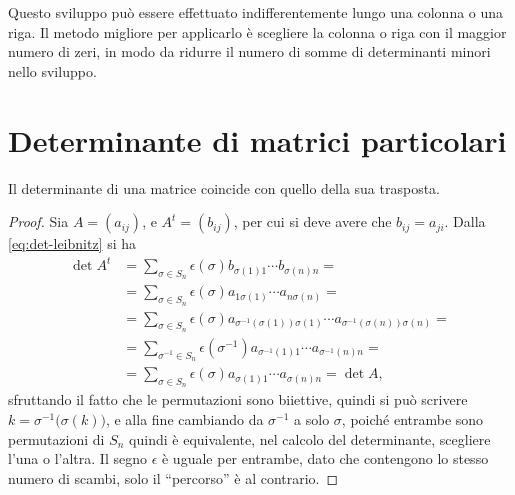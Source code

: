 Questo sviluppo può essere effettuato indifferentemente lungo una colonna o una riga.
Il metodo migliore per applicarlo è scegliere la colonna o riga con il maggior numero di zeri, in modo da ridurre il numero di somme di determinanti minori nello sviluppo.


\section{Determinante di matrici particolari}
\begin{teorema} \label{t:determinante-trasposta}
	Il determinante di una matrice coincide con quello della sua trasposta.
\end{teorema}
	\begin{proof}
	Sia $A=(a_{ij})$, e $A^t=(b_{ij})$, per cui si deve avere che $b_{ij}=a_{ji}$. Dalla \eqref{eq:det-leibnitz} si ha
	\begin{equation*}
		\begin{split}
			\det A^t &=\sum_{\sigma\in S_n}\epsilon(\sigma)b_{\sigma(1)1}\cdots b_{\sigma(n)n}=\\
			&=\sum_{\sigma\in S_n}\epsilon(\sigma)a_{1\sigma(1)}\cdots a_{n\sigma(n)}=\\
			&=\sum_{\sigma\in S_n}\epsilon(\sigma)a_{\sigma^{-1}(\sigma(1))\sigma(1)}\cdots a_{\sigma^{-1}(\sigma(n))\sigma(n)}=\\
			&=\sum_{\sigma^{-1}\in S_n}\epsilon(\sigma^{-1})a_{\sigma^{-1}(1)1}\cdots a_{\sigma^{-1}(n)n}=\\
			&=\sum_{\sigma\in S_n}\epsilon(\sigma)a_{\sigma(1)1}\cdots a_{\sigma(n)n}=\det A,
		\end{split}
	\end{equation*}
	sfruttando il fatto che le permutazioni sono biiettive, quindi si può scrivere $k=\sigma^{-1}\big(\sigma(k)\big)$, e alla fine cambiando da $\sigma^{-1}$ a solo $\sigma$, poiché entrambe sono permutazioni di $S_n$ quindi è equivalente, nel calcolo del determinante, scegliere l'una o l'altra.
	Il segno $\epsilon$ è uguale per entrambe, dato che contengono lo stesso numero di scambi, solo il ``percorso'' è al contrario.
\end{proof}

